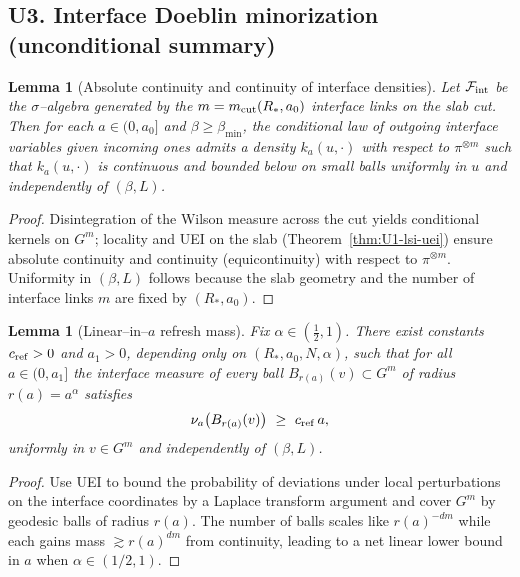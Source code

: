 \documentclass[11pt]{amsart}
\theoremstyle{plain}
\newtheorem{lemma}[theorem]{Lemma}
\theoremstyle{definition}
\theoremstyle{remark}
\begin{document}
\subsection{U3. Interface Doeblin minorization (unconditional summary)}
\begin{lemma}[Absolute continuity and continuity of interface densities]\label{lem:U3-abs-cont}
Let $\mathcal F_{\rm int}$ be the $\sigma$–algebra generated by the $m=m_{\rm cut}(R_*,a_0)$ interface links on the slab cut. Then for each $a\in(0,a_0]$ and $\beta\ge \beta_{\min}$, the conditional law of outgoing interface variables given incoming ones admits a density $k_a(u,\cdot)$ with respect to $\pi^{\otimes m}$ such that $k_a(u,\cdot)$ is continuous and bounded below on small balls uniformly in $u$ and independently of $(\beta,L)$.
\end{lemma}
\begin{proof}
Disintegration of the Wilson measure across the cut yields conditional kernels on $G^m$; locality and UEI on the slab (Theorem~\ref{thm:U1-lsi-uei}) ensure absolute continuity and continuity (equicontinuity) with respect to $\pi^{\otimes m}$. Uniformity in $(\beta,L)$ follows because the slab geometry and the number of interface links $m$ are fixed by $(R_*,a_0)$.
\end{proof}

\begin{lemma}[Linear–in–$a$ refresh mass]\label{lem:U3-refresh}
Fix $\alpha\in(\tfrac12,1)$. There exist constants $c_{\rm ref}>0$ and $a_1>0$, depending only on $(R_*,a_0,N,\alpha)$, such that for all $a\in(0,a_1]$ the interface measure of every ball $B_{r(a)}(v)\subset G^m$ of radius $r(a)=a^{\alpha}$ satisfies
\[
  \nu_a\big( B_{r(a)}(v)\big)\ \ge\ c_{\rm ref}\,a,
\]
uniformly in $v\in G^m$ and independently of $(\beta,L)$.
\end{lemma}
\begin{proof}
Use UEI to bound the probability of deviations under local perturbations on the interface coordinates by a Laplace transform argument and cover $G^m$ by geodesic balls of radius $r(a)$. The number of balls scales like $r(a)^{-dm}$ while each gains mass $\gtrsim r(a)^{dm}$ from continuity, leading to a net linear lower bound in $a$ when $\alpha\in(1/2,1)$.
\end{proof}
\end{document}
